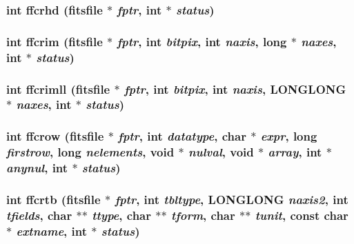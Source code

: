 \subsubsection{\setlength{\rightskip}{0pt plus 5cm}int ffcrhd (\bf{fitsfile} $\ast$ {\em fptr}, int $\ast$ {\em status})}\label{fitsio_8h_edd8581511c1260a6da6ad625ce42d05}


\subsubsection{\setlength{\rightskip}{0pt plus 5cm}int ffcrim (\bf{fitsfile} $\ast$ {\em fptr}, int {\em bitpix}, int {\em naxis}, long $\ast$ {\em naxes}, int $\ast$ {\em status})}\label{fitsio_8h_27679e1fb1c8a2f6a85e1d9f1d4295a7}


\subsubsection{\setlength{\rightskip}{0pt plus 5cm}int ffcrimll (\bf{fitsfile} $\ast$ {\em fptr}, int {\em bitpix}, int {\em naxis}, \bf{LONGLONG} $\ast$ {\em naxes}, int $\ast$ {\em status})}\label{fitsio_8h_1f63a696ea6ed4ca47c04c67264d23e3}


\subsubsection{\setlength{\rightskip}{0pt plus 5cm}int ffcrow (\bf{fitsfile} $\ast$ {\em fptr}, int {\em datatype}, char $\ast$ {\em expr}, long {\em firstrow}, long {\em nelements}, void $\ast$ {\em nulval}, void $\ast$ {\em array}, int $\ast$ {\em anynul}, int $\ast$ {\em status})}\label{fitsio_8h_7460392e7c0487148565dc632faae6f9}


\subsubsection{\setlength{\rightskip}{0pt plus 5cm}int ffcrtb (\bf{fitsfile} $\ast$ {\em fptr}, int {\em tbltype}, \bf{LONGLONG} {\em naxis2}, int {\em tfields}, char $\ast$$\ast$ {\em ttype}, char $\ast$$\ast$ {\em tform}, char $\ast$$\ast$ {\em tunit}, const char $\ast$ {\em extname}, int $\ast$ {\em status})}\label{fitsio_8h_9e0996d3514ac3a9395ffe53f47ae47c}


